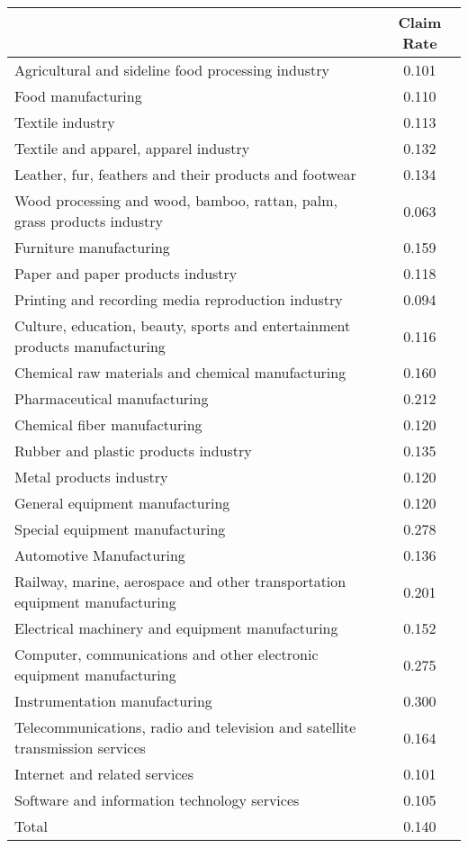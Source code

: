 \begin{tabular}{lc}
\toprule
& Claim Rate \\ \midrule
Agricultural and sideline food processing industry&       0.101\\
Food manufacturing&       0.110\\
Textile industry&       0.113\\
Textile and apparel, apparel industry&       0.132\\
Leather, fur, feathers and their products and footwear&       0.134\\
Wood processing and wood, bamboo, rattan, palm, grass products industry&       0.063\\
Furniture manufacturing&       0.159\\
Paper and paper products industry&       0.118\\
Printing and recording media reproduction industry&       0.094\\
Culture, education, beauty, sports and entertainment products manufacturing&       0.116\\
Chemical raw materials and chemical manufacturing&       0.160\\
Pharmaceutical manufacturing&       0.212\\
Chemical fiber manufacturing&       0.120\\
Rubber and plastic products industry&       0.135\\
Metal products industry&       0.120\\
General equipment manufacturing&       0.120\\
Special equipment manufacturing&       0.278\\
Automotive Manufacturing&       0.136\\
Railway, marine, aerospace and other transportation equipment manufacturing&       0.201\\
Electrical machinery and equipment manufacturing&       0.152\\
Computer, communications and other electronic equipment manufacturing&       0.275\\
Instrumentation manufacturing&       0.300\\
Telecommunications, radio and television and satellite transmission services&       0.164\\
Internet and related services&       0.101\\
Software and information technology services&       0.105\\
Total       &       0.140\\
\bottomrule \end{tabular}
